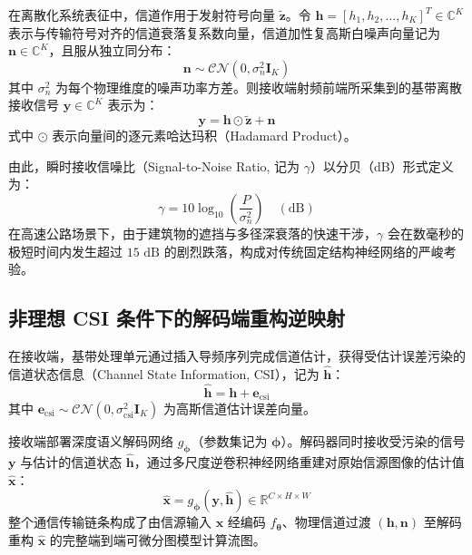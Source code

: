 在离散化系统表征中，信道作用于发射符号向量 $\tilde{\bm{z}}$。令 $\bm{h} = [h_1, h_2, \dots, h_K]^T \in \mathbb{C}^K$ 表示与传输符号对齐的信道衰落复系数向量，信道加性复高斯白噪声向量记为 $\bm{n} \in \mathbb{C}^K$，且服从独立同分布：
\begin{equation}
  \bm{n} \sim \mathcal{CN}(0, \sigma_n^2 \bm{I}_K)
  \label{eq:noise_distribution}
\end{equation}
其中 $\sigma_n^2$ 为每个物理维度的噪声功率方差。则接收端射频前端所采集到的基带离散接收信号 $\bm{y} \in \mathbb{C}^K$ 表示为：
\begin{equation}
  \bm{y} = \bm{h} \odot \tilde{\bm{z}} + \bm{n}
  \label{eq:received_signal_model}
\end{equation}
式中 $\odot$ 表示向量间的逐元素哈达玛积（Hadamard Product）。

由此，瞬时接收信噪比（Signal-to-Noise Ratio, 记为 $\gamma$）以分贝（dB）形式定义为：
\begin{equation}
  \gamma = 10 \log_{10} \left( \frac{P}{\sigma_n^2} \right) \quad (\text{dB})
  \label{eq:snr_definition}
\end{equation}
在高速公路场景下，由于建筑物的遮挡与多径深衰落的快速干涉，$\gamma$ 会在数毫秒的极短时间内发生超过 $15\text{ dB}$ 的剧烈跌落，构成对传统固定结构神经网络的严峻考验。

\subsection{非理想 CSI 条件下的解码端重构逆映射}
在接收端，基带处理单元通过插入导频序列完成信道估计，获得受估计误差污染的信道状态信息（Channel State Information, CSI），记为 $\hat{\bm{h}}$：
\begin{equation}
  \hat{\bm{h}} = \bm{h} + \bm{e}_{\text{csi}}
  \label{eq:imperfect_csi}
\end{equation}
其中 $\bm{e}_{\text{csi}} \sim \mathcal{CN}(0, \sigma_{\text{csi}}^2 \bm{I}_K)$ 为高斯信道估计误差向量。

接收端部署深度语义解码网络 $g_{\bm{\phi}}$（参数集记为 $\bm{\phi}$）。解码器同时接收受污染的信号 $\bm{y}$ 与估计的信道状态 $\hat{\bm{h}}$，通过多尺度逆卷积神经网络重建对原始信源图像的估计值 $\hat{\bm{x}}$：
\begin{equation}
  \hat{\bm{x}} = g_{\bm{\phi}}(\bm{y}, \hat{\bm{h}}) \in \mathbb{R}^{C \times H \times W}
  \label{eq:decoder_reconstruction_deep}
\end{equation}
整个通信传输链条构成了由信源输入 $\bm{x}$ 经编码 $f_{\bm{\theta}}$、物理信道过渡 $(\bm{h}, \bm{n})$ 至解码重构 $\hat{\bm{x}}$ 的完整端到端可微分图模型计算流图。
